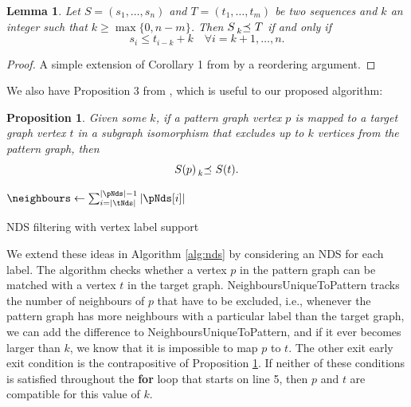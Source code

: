 \documentclass{l4proj}
\newtheorem{lemma}{Lemma}[chapter]
\newtheorem{proposition}{Proposition}[chapter]
\theoremstyle{definition}
\theoremstyle{remark}
\newcommand{\kprec}[1]{\prescript{}{#1}{\preceq}\ }
\begin{document}
\begin{lemma} \label{lemma1}
  Let $S = (s_1, \dots, s_n)$ and $T = (t_1, \dots, t_m)$ be two sequences and
  $k$ an integer such that $k \ge \max\{ 0, n - m \}$. Then $S \kprec{k} T$
  if and only if
  \[ s_i \le t_{i-k} + k \quad \forall i = k + 1, \dots, n. \]
\end{lemma}
\begin{proof}
  A simple extension of Corollary 1 from \cite{DBLP:conf/aaai/HoffmannMR17} by a
  reordering argument.
\end{proof}

We also have Proposition 3 from \cite{DBLP:conf/aaai/HoffmannMR17}, which is
useful to our proposed algorithm:
\begin{proposition} \label{prop:kdown}
  Given some $k$, if a pattern graph vertex $p$ is mapped to a target graph
  vertex $t$ in a subgraph isomorphism that excludes up to $k$ vertices from the
  pattern graph, then
  \[ S(p) \kprec{k} S(t). \]
\end{proposition}

\begin{algorithm}
  $\neighbours \gets \sum_{i=|\tNds|}^{|\pNds| - 1} |\pNds[i]|$\;
  \For{$i \gets 0$ \KwTo $\min\{ |\pNds|, |\tNds| \} - 1$}{
    \If{$|\pNds[i]| - |\tNds[i]| > 0$}{
      $\neighbours \gets \neighbours + |\pNds[i]| - |\tNds[i]|$\;
      \If{$\neighbours > k$}{\Return{false};}
    }
    \If{$\pNds[i] \cancel{\kprec{k}} \tNds[i]$}{\Return{false};}
  }
  \;
  \caption{NDS filtering with vertex label support}
  \label{alg:nds}
\end{algorithm}

We extend these ideas in Algorithm \ref{alg:nds} by considering an NDS for each
label. The algorithm checks whether a vertex $p$ in the pattern graph can be
matched with a vertex $t$ in the target graph.
\textsf{NeighboursUniqueToPattern} tracks the number of neighbours of $p$ that
have to be excluded, i.e., whenever the pattern graph has more neighbours with a
particular label than the target graph, we can add the difference to
\textsf{NeighboursUniqueToPattern}, and if it ever becomes larger than $k$, we
know that it is impossible to map $p$ to $t$. The other exit early exit
condition is the contrapositive of Proposition \ref{prop:kdown}. If neither of
these conditions is satisfied throughout the \textbf{for} loop that starts on
line 5, then $p$ and $t$ are compatible for this value of $k$.
\end{document}
